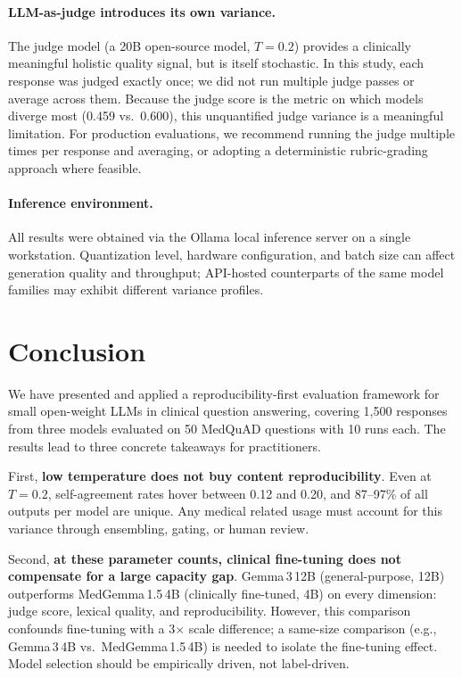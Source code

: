 \documentclass[11pt]{article}
\begin{document}
\paragraph{LLM-as-judge introduces its own variance.}
The judge model (a 20B open-source model, $T{=}0.2$) provides a
clinically meaningful holistic quality signal, but is itself
stochastic. In this study, each response was judged exactly once;
we did not run multiple judge passes or average across them.
Because the judge score is the metric on which models diverge
most (0.459 vs.\ 0.600), this unquantified judge variance is a
meaningful limitation.
For production evaluations, we recommend running the judge multiple
times per response and averaging, or adopting a deterministic
rubric-grading approach where feasible.

\paragraph{Inference environment.}
All results were obtained via the Ollama local inference server on a
single workstation.
Quantization level, hardware configuration, and batch size can affect
generation quality and throughput; API-hosted counterparts of the same
model families may exhibit different variance profiles.

\section{Conclusion}

We have presented and applied a reproducibility-first evaluation
framework for small open-weight LLMs in clinical question answering,
covering 1,500 responses from three models evaluated on 50 MedQuAD
questions with 10 runs each.
The results lead to three concrete takeaways for practitioners.

First, \textbf{low temperature does not buy content reproducibility}.
Even at $T{=}0.2$, self-agreement rates hover between 0.12 and 0.20,
and 87--97\% of all outputs per model are unique.
Any medical related usage must account for this variance through
ensembling, gating, or human review.

Second, \textbf{at these parameter counts, clinical fine-tuning does
not compensate for a large capacity gap}.
Gemma\,3\,12B (general-purpose, 12B) outperforms MedGemma\,1.5\,4B
(clinically fine-tuned, 4B) on every dimension: judge score, lexical
quality, and reproducibility.
However, this comparison confounds fine-tuning with a 3$\times$ scale
difference; a same-size comparison (e.g., Gemma\,3\,4B vs.\
MedGemma\,1.5\,4B) is needed to isolate the fine-tuning effect.
Model selection should be empirically driven, not label-driven.
\end{document}
